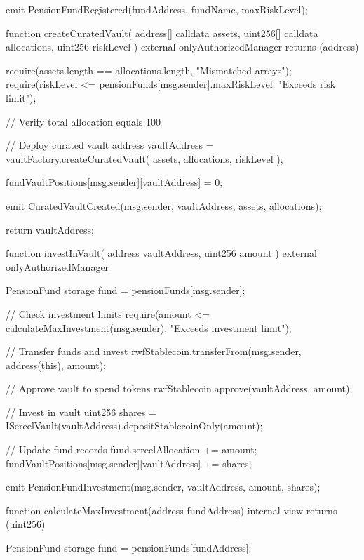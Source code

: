 \documentclass[12pt]{article}
\begin{document}
{{{        emit PensionFundRegistered(fundAddress, fundName, maxRiskLevel);    }

    function createCuratedVault(        address[] calldata assets,        uint256[] calldata allocations,        uint256 riskLevel    ) external onlyAuthorizedManager returns (address) {        require(assets.length == allocations.length, "Mismatched arrays");        require(riskLevel <= pensionFunds[msg.sender].maxRiskLevel, "Exceeds risk limit");

        // Verify total allocation equals 100%

        // Deploy curated vault        address vaultAddress = vaultFactory.createCuratedVault(            assets,            allocations,            riskLevel        );

        fundVaultPositions[msg.sender][vaultAddress] = 0;

        emit CuratedVaultCreated(msg.sender, vaultAddress, assets, allocations);

        return vaultAddress;    }

    function investInVault(        address vaultAddress,        uint256 amount    ) external onlyAuthorizedManager {        PensionFund storage fund = pensionFunds[msg.sender];

        // Check investment limits        require(amount <= calculateMaxInvestment(msg.sender), "Exceeds investment limit");

        // Transfer funds and invest        rwfStablecoin.transferFrom(msg.sender, address(this), amount);

        // Approve vault to spend tokens        rwfStablecoin.approve(vaultAddress, amount);

        // Invest in vault        uint256 shares = ISereelVault(vaultAddress).depositStablecoinOnly(amount);

        // Update fund records        fund.sereelAllocation += amount;        fundVaultPositions[msg.sender][vaultAddress] += shares;

        emit PensionFundInvestment(msg.sender, vaultAddress, amount, shares);    }

    function calculateMaxInvestment(address fundAddress) internal view returns (uint256) {        PensionFund storage fund = pensionFunds[fundAddress];

}}}
\end{document}
